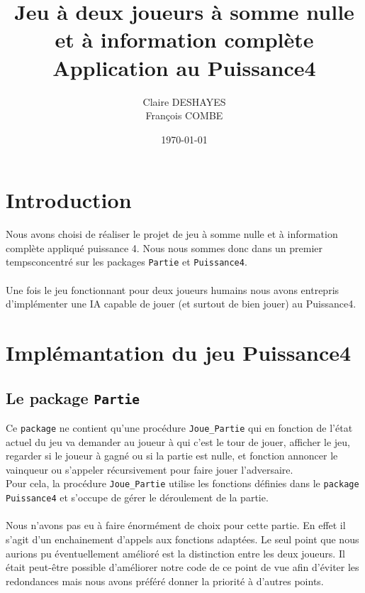 \documentclass[a4paper,11pt]{article}
\begin{document}
\title {Jeu à deux joueurs à somme nulle et à information complète \\
Application au Puissance4}

\author{Claire DESHAYES \\ François COMBE}
\date{\today}
\maketitle

\section*{Introduction}

Nous avons choisi de réaliser le projet de jeu à somme nulle
et à information complète appliqué puissance 4. Nous nous sommes
donc dans un premier tempsconcentré sur les packages {\tt Partie}
et {\tt Puissance4}. \\ \\
Une fois le jeu fonctionnant pour deux joueurs humains nous avons
entrepris d'implémenter une IA capable de jouer (et surtout de bien
jouer) au Puissance4.

\section{Implémantation du jeu Puissance4}

\subsection{Le package {\tt Partie}}

Ce {\tt package} ne contient qu'une procédure {\tt Joue\_Partie} qui en
fonction de l'état actuel du jeu va demander au joueur à qui c'est le
tour de jouer, afficher le jeu, regarder si le joueur à gagné ou si la partie
est nulle, et fonction annoncer le vainqueur ou s'appeler récursivement pour
faire jouer l'adversaire. \\
Pour cela, la procédure {\tt Joue\_Partie} utilise les fonctions définies dans
le {\tt package Puissance4} et s'occupe de gérer le déroulement de la partie.\\
\\
Nous n'avons pas eu à faire énormément de choix pour cette partie. En
effet il s'agit d'un enchainement d'appels aux fonctions adaptées.
Le seul point que nous aurions pu éventuellement amélioré est la distinction
entre les deux joueurs. Il était peut-être possible d'améliorer notre code
de ce point de vue afin d'éviter les redondances mais nous avons préféré
donner la priorité à d'autres points.
\end{document}
